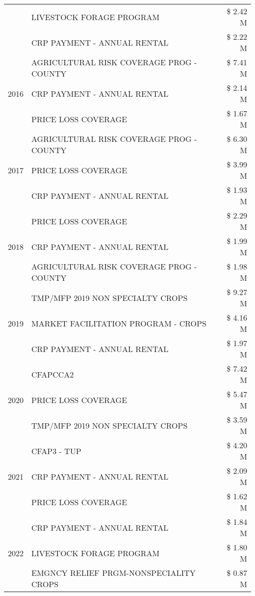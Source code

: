 \begin{tabular}{llr}
 & LIVESTOCK FORAGE PROGRAM & \$ 2.42 M \\
 & CRP PAYMENT - ANNUAL RENTAL & \$ 2.22 M \\
\cline{1-3}
\multirow[t]{3}{*}{2016} & AGRICULTURAL RISK COVERAGE PROG - COUNTY & \$ 7.41 M \\
 & CRP PAYMENT - ANNUAL RENTAL & \$ 2.14 M \\
 & PRICE LOSS COVERAGE & \$ 1.67 M \\
\cline{1-3}
\multirow[t]{3}{*}{2017} & AGRICULTURAL RISK COVERAGE PROG - COUNTY & \$ 6.30 M \\
 & PRICE LOSS COVERAGE & \$ 3.99 M \\
 & CRP PAYMENT - ANNUAL RENTAL & \$ 1.93 M \\
\cline{1-3}
\multirow[t]{3}{*}{2018} & PRICE LOSS COVERAGE & \$ 2.29 M \\
 & CRP PAYMENT - ANNUAL RENTAL & \$ 1.99 M \\
 & AGRICULTURAL RISK COVERAGE PROG - COUNTY & \$ 1.98 M \\
\cline{1-3}
\multirow[t]{3}{*}{2019} & TMP/MFP 2019 NON SPECIALTY CROPS & \$ 9.27 M \\
 & MARKET FACILITATION PROGRAM - CROPS & \$ 4.16 M \\
 & CRP PAYMENT - ANNUAL RENTAL & \$ 1.97 M \\
\cline{1-3}
\multirow[t]{3}{*}{2020} & CFAPCCA2 & \$ 7.42 M \\
 & PRICE LOSS COVERAGE & \$ 5.47 M \\
 & TMP/MFP 2019 NON SPECIALTY CROPS & \$ 3.59 M \\
\cline{1-3}
\multirow[t]{3}{*}{2021} & CFAP3 - TUP & \$ 4.20 M \\
 & CRP PAYMENT - ANNUAL RENTAL & \$ 2.09 M \\
 & PRICE LOSS COVERAGE & \$ 1.62 M \\
\cline{1-3}
\multirow[t]{3}{*}{2022} & CRP PAYMENT - ANNUAL RENTAL & \$ 1.84 M \\
 & LIVESTOCK FORAGE PROGRAM & \$ 1.80 M \\
 & EMGNCY RELIEF PRGM-NONSPECIALITY CROPS & \$ 0.87 M \\
\cline{1-3}
\bottomrule
\end{tabular}
